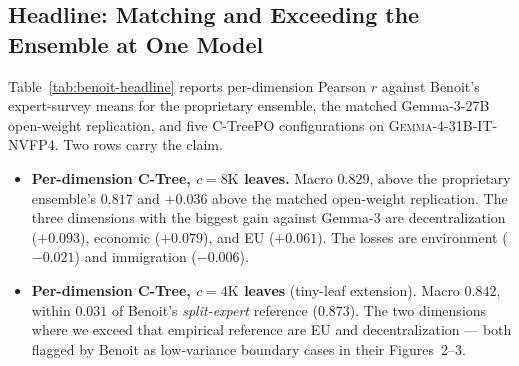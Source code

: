 \subsection{Headline: Matching and Exceeding the Ensemble at One Model}\label{sec:benoit-headline}

Table~\ref{tab:benoit-headline} reports per-dimension Pearson $r$
against Benoit's expert-survey means for the proprietary ensemble, the
matched Gemma-3-27B open-weight replication, and five C-TreePO
configurations on \textsc{Gemma-4-31B-IT-NVFP4}. Two rows carry the
claim.

\begin{itemize}[leftmargin=1.5em]
    \item \textbf{Per-dimension C-Tree, $c = 8\mathrm{K}$ leaves.}
          Macro $0.829$, above the proprietary ensemble's $0.817$ and
          $+0.036$ above the matched open-weight replication. The
          three dimensions with the biggest gain against Gemma-3
          are decentralization ($+0.093$), economic ($+0.079$), and
          EU ($+0.061$). The losses are environment ($-0.021$) and
          immigration ($-0.006$).
    \item \textbf{Per-dimension C-Tree, $c = 4\mathrm{K}$ leaves}
          (tiny-leaf extension). Macro $0.842$, within $0.031$ of
          Benoit's \emph{split-expert} reference ($0.873$). The
          two dimensions where we exceed that empirical reference are
          EU and decentralization --- both flagged by Benoit as
          low-variance boundary cases in their Figures~2--3.
\end{itemize}

\begin{table}[t]
    \centering
    \resizebox{\linewidth}{!}{}
    \caption{Pearson $r$ against Benoit expert-survey means across six
    policy dimensions. The first block reproduces
    \citet{BenoitEtAl2025}'s published numbers (Fig.~1 proprietary
    ensemble, Tab.~3 split-expert reference, Tab.~6 open-weight
    replication at Gemma-3-27B). The Table~3 row is an empirical
    agreement reference, not a theoretical limit. The remaining
    blocks are C-TreePO on Gemma-4-31B-NVFP4 across chunk sizes $c$,
    under the per-dimension
    and joint variants. The macro column is the unweighted mean
    across dimensions for each row. Full per-cell table with
    coverage, ablations, and compute accounting appears in
    Appendix~\ref{app:benoit-replication}.}\label{tab:benoit-headline}
\end{table}

